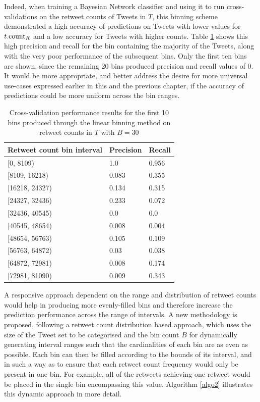 Indeed, when training a Bayesian Network classifier and using it to run cross-validations on the retweet counts of Tweets in $T$, this binning scheme demonstrated a high accuracy of predictions on Tweets with lower values for $t.\textrm{count}_R$ and a low accuracy for Tweets with higher counts. Table \ref{table:linear_bin_performance} shows this high precision and recall for the bin containing the majority of the Tweets, along with the very poor performance of the subsequent bins. Only the first ten bins are shown, since the remaining 20 bins produced precision and recall values of 0. It would be more appropriate, and better address the desire for more universal use-cases expressed earlier in this and the previous chapter, if the accuracy of predictions could be more uniform across the bin ranges.

\begin{table}[h]\footnotesize
\begin{center}
\begin{tabular}{ l | l | l }
	Retweet count bin interval	& Precision & Recall \\
	\hline
	\hline 
    {[0, 8109)}        &   1.0     &   0.956\\
    {[8109, 16218)}    &   0.083   &   0.355\\
    {[16218, 24327)}  &   0.134   &   0.315\\
    {[24327, 32436)}  &   0.233   &   0.072\\
    {[32436, 40545)}  &   0.0       &   0.0\\ 
    {[40545, 48654)}  &   0.008   &   0.004\\
    {[48654, 56763)}  &   0.105   &   0.109\\
    {[56763, 64872)}  &   0.03    &   0.038\\
    {[64872, 72981)}  &   0.008   &   0.174\\
    {[72981, 81090)}  &   0.009   &   0.343\\
    \hline  
\end{tabular}
\end{center}
\caption{Cross-validation performance results for the first 10 bins produced through the linear binning method on retweet counts in $T$ with $B=30$}
\label{table:linear_bin_performance}
\end{table}

A responsive approach dependent on the range and distribution of retweet counts would help in producing more evenly-filled bins and therefore increase the prediction performance across the range of intervals. A new methodology is proposed, following a retweet count distribution based approach, which uses the size of the Tweet set to be categorised and the bin count $B$ for dynamically generating interval ranges such that the cardinalities of each bin are as even as possible. Each bin can then be filled according to the bounds of its interval, and in such a way as to ensure that each retweet count frequency would only be present in one bin. For example, all of the retweets achieving one retweet would be placed in the single bin encompassing this value. Algorithm \ref{algo2} illustrates this dynamic approach in more detail.

